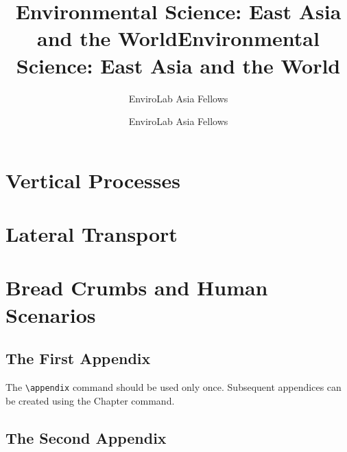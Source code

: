 \documentclass{book}%
\title{Environmental Science: East Asia and the World}
\author{EnviroLab Asia Fellows}
\title{Environmental Science: East Asia and the World}
\author{EnviroLab Asia Fellows}
\begin{document}
\frontmatter

\maketitle
\tableofcontents




\mainmatter
\part{Vertical Processes}














\part{Lateral Transport}







\part{Bread Crumbs and Human Scenarios}





\appendix

\chapter{The First Appendix}

The \verb"\appendix" command should be used only once. Subsequent appendices can
be created using the Chapter command.

\chapter{The Second Appendix}
\end{document}
